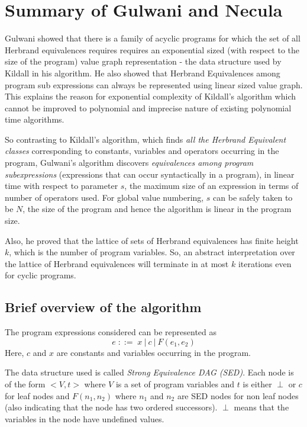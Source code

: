 \chapter{Summary of Gulwani and Necula}
\label{chap:chapter3}

Gulwani showed that there is a family of acyclic programs for which 
the set of all Herbrand equivalences requires requires an exponential 
sized (with respect to the size of the program) value graph 
representation - the data structure used by Kildall in his algorithm. 
He also showed that Herbrand Equivalences among program sub 
expressions can always be represented using linear sized value graph. 
This explains the reason for exponential complexity of Kildall's 
algorithm which cannot be improved to polynomial and imprecise nature 
of existing polynomial time algorithms.

So contrasting to Kildall's algorithm, which finds \textit{all the 
Herbrand Equivalent classes} corresponding to constants, variables 
and operators occurring in the program, Gulwani's algorithm discovers 
\textit{equivalences among program subexpressions} (expressions that 
can occur syntactically in a program), in linear time with respect to 
parameter $s$, the maximum size of an expression in terms of number 
of operators used. For global value numbering, $s$ can be safely 
taken to be $N$, the size of the program and hence the algorithm is 
linear in the program size.

Also, he proved that the lattice of sets of Herbrand equivalences has 
finite height $k$, which is the number of program variables. So, an 
abstract interpretation over the lattice of Herbrand equivalences 
will terminate in at most $k$ iterations even for cyclic programs.

\section{Brief overview of the algorithm}
The program expressions considered can be represented as
$$e\; ::=\; x\: |\: c\: |\:F(e_1, e_2)$$
Here, $c$ and $x$ are constants and variables occurring in the 
program.

The data structure used is called \textit{Strong Equivalence DAG 
(SED)}. Each node is of the form $<V,t>$ where $V$ is a set of 
program variables and $t$ is either $\perp$ or $c$ for leaf nodes and 
$F(n_1, n_2)$ where $n_1$ and $n_2$ are SED nodes for non leaf nodes
(also indicating that the node has two ordered successors). $\perp$ 
means that the variables in the node have undefined values.


